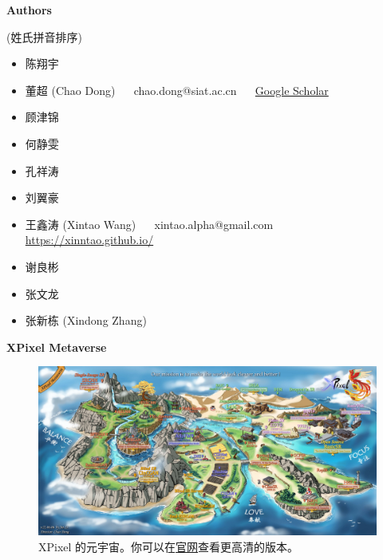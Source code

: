 \documentclass[../main.tex]{subfiles}
\begin{document}
\newpage

{\Large\textbf{Authors}}

(姓氏拼音排序)

\begin{itemize}
	\item 陈翔宇
	\item 董超 (Chao Dong) ~~ chao.dong@siat.ac.cn ~~
	 \href{https://scholar.google.com.hk/citations?user=OSDCB0UAAAAJ}{Google Scholar}
	\item 顾津锦
	\item 何静雯
	\item 孔祥涛
	\item 刘翼豪
	\item 王鑫涛 (Xintao Wang) ~~ xintao.alpha@gmail.com ~~ \url{https://xinntao.github.io/}
	\item 谢良彬
	\item 张文龙
	\item 张新栋 (Xindong Zhang)
\end{itemize}

\newpage
{\Large\textbf{ XPixel Metaverse}}

\begin{figure}[h]
	\vspace{1cm}
	\begin{center}
		\includegraphics[width=\linewidth]{figures/XPixelMetaverse_small.jpg}
		\caption{XPixel 的元宇宙。你可以在\href{https://xpixel.group/2022/06/06/poster.html}{官网}查看更高清的版本。}
	\end{center}
\end{figure}
\end{document}
